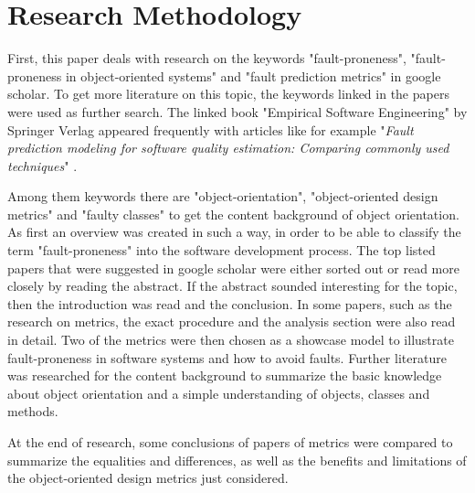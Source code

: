\section{Research Methodology}\label{research}

First, this paper deals with research on the keywords "fault-proneness", "fault-proneness in object-oriented systems" and "fault prediction metrics" in google scholar. To get more literature on this topic, the keywords linked in the papers were used as further search. The linked book "Empirical Software Engineering" by Springer Verlag appeared frequently with articles like for example "\textit{Fault prediction modeling for software quality estimation: Comparing commonly used techniques}" \cite{khoshgoftaar2003fault}. 

Among them keywords there are "object-orientation", "object-oriented design metrics" and "faulty classes" to get the content background of object orientation. As first an overview was created in such a way, in order to be able to classify the term "fault-proneness" into the software development process. The top listed papers that were suggested in google scholar were either sorted out or read more closely by reading the abstract. If the abstract sounded interesting for the topic, then the introduction was read and the conclusion. In some papers, such as the research on metrics, the exact procedure and the analysis section were also read in detail. Two of the metrics were then chosen as a showcase model to illustrate fault-proneness in software systems and how to avoid faults. Further literature was researched for the content background to summarize the basic knowledge about object orientation and a simple understanding of objects, classes and methods. 

At the end of research, some conclusions of papers of metrics were compared to summarize the equalities and differences, as well as the benefits and limitations of the object-oriented design metrics just considered.




